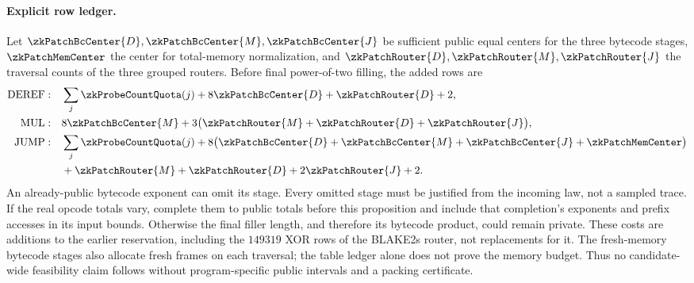 \paragraph{Explicit row ledger.} Let $\zkPatchBcCenter{D},\zkPatchBcCenter{M},\zkPatchBcCenter{J}$ be sufficient public equal centers for the three bytecode stages, $\zkPatchMemCenter$ the center for total-memory normalization, and $\zkPatchRouter{D},\zkPatchRouter{M},\zkPatchRouter{J}$ the traversal counts of the three grouped routers. Before final power-of-two filling, the added rows are
\[
\begin{aligned}
 \mathrm{DEREF}:\quad& \sum_j\zkProbeCountQuota(j)+8\zkPatchBcCenter{D}+\zkPatchRouter{D}+2,\\
 \mathrm{MUL}:\quad&8\zkPatchBcCenter{M}+3\bigl(\zkPatchRouter{M}+\zkPatchRouter{D}+\zkPatchRouter{J}\bigr),\\
 \mathrm{JUMP}:\quad&\sum_j\zkProbeCountQuota(j)
  +8\bigl(\zkPatchBcCenter{D}+\zkPatchBcCenter{M}+\zkPatchBcCenter{J}+\zkPatchMemCenter\bigr)\\
 &+\zkPatchRouter{M}+\zkPatchRouter{D}+2\zkPatchRouter{J}+2.
\end{aligned}
\]
An already-public bytecode exponent can omit its stage. Every omitted stage must be justified from the incoming law, not a sampled trace. If the real opcode totals vary, complete them to public totals before this proposition and include that completion's exponents and prefix accesses in its input bounds. Otherwise the final filler length, and therefore its bytecode product, could remain private. These costs are additions to the earlier reservation, including the $149319$ XOR rows of the BLAKE2s router, not replacements for it. The fresh-memory bytecode stages also allocate fresh frames on each traversal; the table ledger alone does not prove the memory budget. Thus no candidate-wide feasibility claim follows without program-specific public intervals and a packing certificate.

